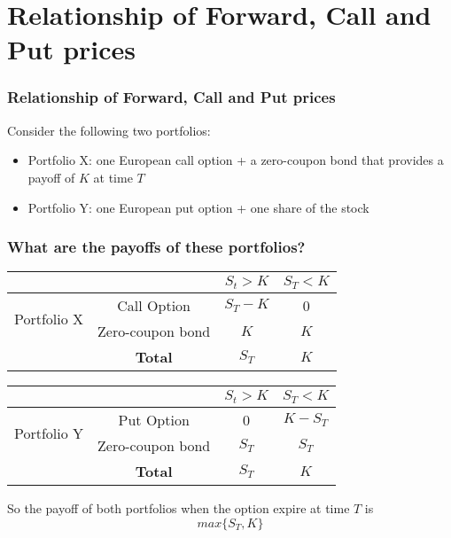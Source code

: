 \documentclass[ignorenonframetext, 9pt]{beamer}
\begin{document}
\section{Relationship of Forward, Call and Put prices}

\begin{frame}
\frametitle{Relationship of Forward, Call and Put prices}

Consider the following two portfolios: \newline
\begin{itemize}
\item Portfolio X: one European call option + a zero-coupon bond that provides a payoff of $K$ at time $T$

\item Portfolio Y: one European put option + one share of the stock
\end{itemize}

\end{frame}

\begin{frame}
\frametitle{What are the payoffs of these portfolios?}
{
\footnotesize
\begin{tabular}{cc|c|c}
&& $S_t > K$ & $S_T < K$ \\ \hline
\multirow{2}{*}{Portfolio X} & Call Option & $S_T - K$ & 0 \\
& Zero-coupon bond & $K$ & $K$ \\ \hline
& \textbf{Total} & $S_T$ & $K$ \\
\end{tabular}
}

\vspace{1cm}
\pause

{
\footnotesize
\begin{tabular}{cc|c|c}
&& $S_t > K$ & $S_T < K$ \\ \hline
\multirow{2}{*}{Portfolio Y} & Put Option & 0 & $K - S_T$  \\
& Zero-coupon bond & $S_T$ & $S_T$ \\ \hline
& \textbf{Total} & $S_T$ & $K$ \\
\end{tabular}
}

\vspace{1cm}
\pause

So the payoff of both portfolios when the option expire at time $T$ is
\begin{equation*}
max\lbrace S_T, K\rbrace
\end{equation*}

\end{frame}
\end{document}

